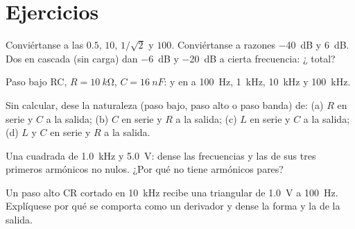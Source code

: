 \section{Ejercicios}

\begin{exercise}[$\star$]\label{exo:b1:filters-transfer-functions:1}
Conviértanse a  las  $0.5$, $10$, $1/\sqrt2$ y $100$.
Conviértanse a razones \qty{-40}{dB} y \qty{+6}{dB}. Dos  en
cascada (sin carga) dan \qty{-6}{dB} y \qty{-20}{dB} a cierta frecuencia:
¿ total?
\end{exercise}

\begin{exercise}[$\star$]\label{exo:b1:filters-transfer-functions:2}
Paso bajo RC, $R = \qty{10}{k\ohm}$, $C = \qty{16}{nF}$:  y  en  a \qty{100}{Hz}, \qty{1}{kHz},
\qty{10}{kHz} y \qty{100}{kHz}.
\end{exercise}

\begin{exercise}[$\star$]\label{exo:b1:filters-transfer-functions:3}
Sin calcular, dese la naturaleza (paso bajo, paso alto o paso banda) de:
(a) $R$ en serie y $C$ a la salida; (b) $C$ en serie y $R$ a la salida;
(c) $L$ en serie y $C$ a la salida; (d) $L$ y $C$ en serie y $R$ a la
salida.
\end{exercise}

\begin{exercise}[$\star$]\label{exo:b1:filters-transfer-functions:4}
Una  cuadrada de \qty{1.0}{kHz} y  \qty{5.0}{V}: dense las
frecuencias y las  de sus tres primeros armónicos no nulos. ¿Por
qué no tiene armónicos pares?
\end{exercise}

\begin{exercise}[$\star\star$]\label{exo:b1:filters-transfer-functions:5}
Un paso alto CR cortado en \qty{10}{kHz} recibe una  triangular de
 \qty{1.0}{V} a \qty{100}{Hz}. Explíquese por qué se comporta como
un derivador y dense la forma y la  de la salida.
\end{exercise}

